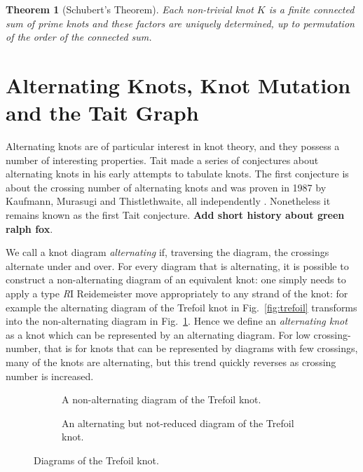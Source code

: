 \documentclass[12pt]{report}
\newcommand{\notered}[1]{{\color{Red} \textbf{#1}}}
\newtheorem*{theorem}{Theorem}
\theoremstyle{upright}
\begin{document}
\begin{theorem}[Schubert's Theorem]
	Each non-trivial knot $K$ is a finite connected sum of prime knots and these factors are uniquely determined, up to permutation of the order of the connected sum. 
\end{theorem}

\section{Alternating Knots, Knot Mutation and the Tait Graph}
Alternating knots are of particular interest in knot theory, and they possess a number of interesting properties. Tait made a series of conjectures about alternating knots in his early attempts to tabulate knots. The first conjecture is about the crossing number of alternating knots and was proven in 1987 by Kaufmann, Murasugi and Thistlethwaite, all independently \cite{state-models-jones-polynomial, jones-polynomials-classical-conjectures, spanning-tree-expansion-jones-polynomial}. Nonetheless it remains known as the first Tait conjecture. \notered{Add short history about green ralph fox}.

We call a knot diagram \textit{alternating} if, traversing the diagram, the crossings alternate under and over. For every diagram that is alternating, it is possible to construct a non-alternating diagram of an equivalent knot: one simply needs to apply a type \textit{R}I Reidemeister move appropriately to any strand of the knot: for example the alternating diagram of the Trefoil knot in Fig.~\ref{fig:trefoil} transforms into the non-alternating diagram in Fig.~\ref{fig:trefoil-nonalternating}. Hence we define an \textit{alternating knot} as a knot which can be represented by an alternating diagram. For low crossing-number, that is for knots that can be represented by diagrams with few crossings, many of the knots are alternating, but this trend quickly reverses as crossing number is increased.


\begin{figure}[hbt!]
	\centering
	\hspace*{\fill}
	\begin{subfigure}[b]{0.4 \textwidth}
		\centering
		\def\svgscale{0.23}
		
		\caption{A non-alternating diagram of the Trefoil knot.}
		\label{fig:trefoil-nonalternating}
	\end{subfigure}
	\hspace*{\fill} \hspace*{\fill}	\hspace*{\fill}
	\begin{subfigure}[b]{0.4 \textwidth}
		\centering
		\def\svgscale{0.23}
		
		\caption{An alternating but not-reduced diagram of the Trefoil knot.}
		\label{fig:trefoil-nugatory}
	\end{subfigure}
	\hspace*{\fill} 
	\caption{Diagrams of the Trefoil knot.}
	\label{fig:trefoil-diagrams}
\end{figure}
\end{document}
